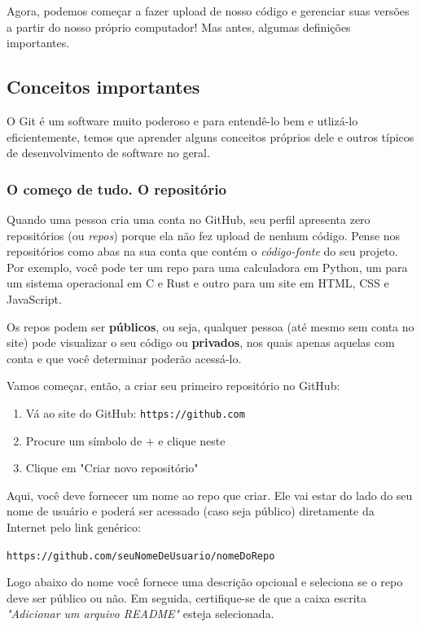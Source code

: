 \documentclass{article}
\begin{document}
	Agora, podemos começar a fazer upload de nosso código e gerenciar suas versões a partir do nosso próprio computador! Mas antes,
	algumas definições importantes. 

	\subsection{Conceitos importantes}

	O Git é um software muito poderoso e para entendê-lo bem e utlizá-lo eficientemente, temos que aprender alguns conceitos 
	próprios dele e outros típicos de desenvolvimento de software no geral. 

	\subsubsection{O começo de tudo. O repositório}

	Quando uma pessoa cria uma conta no GitHub, seu perfil apresenta zero repositórios (ou \textit{repos}) porque ela não fez upload de nenhum 
	código. Pense nos repositórios como abas na sua conta que contém o \textit{código-fonte} do seu projeto. Por exemplo, 
	você pode ter um repo para uma calculadora em Python, um para um sistema operacional em C e Rust e outro para um site em 
	HTML, CSS e JavaScript. 

	Os repos podem ser \textbf{públicos}, ou seja, qualquer pessoa (até mesmo sem conta no site) pode visualizar o seu código ou 
	\textbf{privados}, nos quais apenas aquelas com conta e que você determinar poderão acessá-lo. 

	Vamos começar, então, a criar seu primeiro repositório no GitHub: 
	\begin{enumerate} 
		\item{Vá ao site do GitHub: \texttt{https://github.com}}
		\item{Procure um símbolo de $ + $ e clique neste}
		\item{Clique em "Criar novo repositório"}
	\end{enumerate}

	Aqui, você deve fornecer um nome ao repo que criar. Ele vai estar do lado do seu nome de usuário e poderá ser acessado 
	(caso seja público) diretamente da Internet pelo link genérico: 
	
	\vspace{1ex}
	\texttt{https://github.com/seuNomeDeUsuario/nomeDoRepo}
	\vspace{1ex}

	Logo abaixo do nome você fornece uma descrição opcional e seleciona se o repo deve ser público ou não. 
	Em seguida, certifique-se de que a caixa escrita \textit{"Adicionar um arquivo README"} esteja selecionada. 
	
\end{document}
